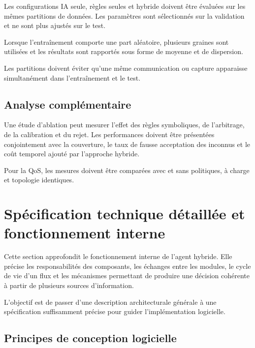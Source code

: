 Les configurations IA seule, règles seules et hybride
doivent être évaluées sur les mêmes partitions de données.
Les paramètres sont sélectionnés sur la validation et
ne sont plus ajustés sur le test.

Lorsque l'entraînement comporte une part aléatoire,
plusieurs graines sont utilisées et les résultats sont
rapportés sous forme de moyenne et de dispersion.

Les partitions doivent éviter qu'une même communication
ou capture apparaisse simultanément dans l'entraînement
et le test.

\subsection{Analyse complémentaire}

Une étude d'ablation peut mesurer l'effet des règles
symboliques, de l'arbitrage, de la calibration et du rejet.
Les performances doivent être présentées conjointement
avec la couverture, le taux de fausse acceptation des
inconnus et le coût temporel ajouté par l'approche hybride.

Pour la QoS, les mesures doivent être comparées avec
et sans politiques, à charge et topologie identiques.





\section{Spécification technique détaillée et fonctionnement interne}

Cette section approfondit le fonctionnement interne de l'agent hybride. Elle précise les responsabilités des composants, les échanges entre les modules, le cycle de vie d'un flux et les mécanismes permettant de produire une décision cohérente à partir de plusieurs sources d'information.

L'objectif est de passer d'une description architecturale générale à une spécification suffisamment précise pour guider l'implémentation logicielle.

\subsection{Principes de conception logicielle}


